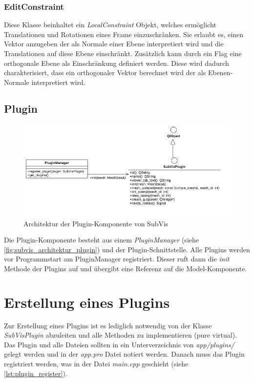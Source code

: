\subsubsection{EditConstraint}

Diese Klasse beinhaltet ein \emph{LocalConstraint} Objekt, welches ermöglicht Translationen und Rotationen eines Frame einzuschränken.
Sie erlaubt es, einen Vektor anzugeben der als Normale einer Ebene interpretiert wird und die Translationen auf diese Ebene einschränkt.
Zusätzlich kann durch ein Flag eine orthogonale Ebene als Einschränkung definiert werden. 
Diese wird dadurch charakterisiert, dass ein orthogonaler Vektor berechnet wird der als Ebenen-Normale interpretiert wird.


\subsection{Plugin}

\begin{figure}
  \centering
  \includegraphics[width=\textwidth]{content/media/subvis_architektur_plugin.png}
  \caption{Architektur der Plugin-Komponente von SubVis}
  \label{fig:subvis_architektur_plugin}
\end{figure}

Die Plugin-Komponente besteht aus einem \emph{PluginManager} (siehe \autoref{fig:subvis_architektur_plugin}) und der Plugin-Schnittstelle.
Alle Plugins werden vor Programmstart am PluginManager registriert.
Dieser ruft dann die \emph{init} Methode der Plugins auf und übergibt eine Referenz auf die Model-Komponente.


\section{Erstellung eines Plugins}

Zur Erstellung eines Plugins ist es lediglich notwendig von der Klasse \emph{SubVisPlugin} abzuleiten und alle Methoden zu implementieren (pure virtual).
Das Plugin und alle Dateien sollten in ein Unterverzeichnis von \emph{app/plugins/} gelegt werden und in der \emph{app.pro} Datei notiert werden.
Danach muss das Plugin registriert werden, was in der Datei \emph{main.cpp} geschieht (siehe \autoref{lst:plugin_register}).

